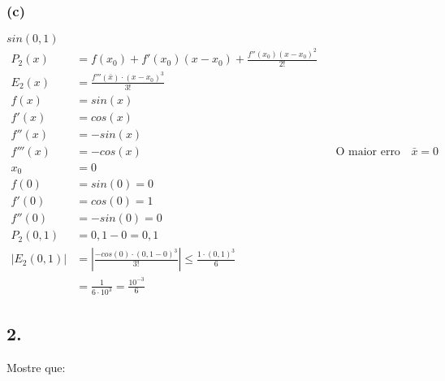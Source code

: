 \documentclass{article}
\begin{document}
\subsubsection{(c)}
$sin(0,1)$
\begin{align}
  P_2(x)
  &= f(x_0) + f'(x_0)(x-x_0) + \frac{f''(x_0)(x-x_0)^2} {2!} \\
  E_2(x)
  &= \frac{f'''(\bar{x}) \cdot (x-x_0)^3}{3!} \\
  f(x)
  &= sin(x) \\
  f'(x)
  &= cos(x) \\
  f''(x)
  &= -sin(x) \\
  f'''(x)
  &= -cos(x)
  && \text{O maior erro possível ocorre quando $\bar{x} = 0$} \\
  x_0
  &= 0 \\
  f(0)
  &= sin(0)
  = 0 \\
  f'(0)
  &= cos(0)
  = 1 \\
  f''(0)
  &= -sin(0)
  = 0 \\
  P_2(0,1)
  &= 0,1 - 0
  = 0,1 \\
  |E_2(0,1)|
  &= \left|\frac{-cos(0) \cdot (0,1 - 0)^3}{3!}\right|
  \leq \frac{1 \cdot (0,1)^3}{6} \\
  &= \frac{1}{6 \cdot 10^3}
  = \frac{10^{-3}}{6}
\end{align}
\setcounter{equation}{0}
\clearpage


\subsection{2.}
Mostre que:
\end{document}
